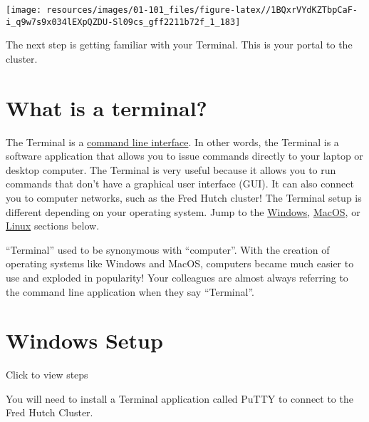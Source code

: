 \documentclass[
]{book}
\begin{document}
\begin{center}\texttt{[image: resources/images/01-101\_files/figure-latex//1BQxrVYdKZTbpCaF-i\_q9w7s9x034lEXpQZDU-Sl09cs\_gff2211b72f\_1\_183]} \end{center}

The next step is getting familiar with your Terminal. This is your portal to the cluster.

\hypertarget{what-is-a-terminal}{%
\section{What is a terminal?}\label{what-is-a-terminal}}

The Terminal is a \href{https://www.codecademy.com/article/command-line-interface}{command line interface}. In other words, the Terminal is a software application that allows you to issue commands directly to your laptop or desktop computer. The Terminal is very useful because it allows you to run commands that don't have a graphical user interface (GUI). It can also connect you to computer networks, such as the Fred Hutch cluster! The Terminal setup is different depending on your operating system. Jump to the \protect\hyperlink{windows}{Windows}, \protect\hyperlink{mac}{MacOS}, or \protect\hyperlink{linux}{Linux} sections below.

``Terminal'' used to be synonymous with ``computer''. With the creation of operating systems like Windows and MacOS, computers became much easier to use and exploded in popularity! Your colleagues are almost always referring to the command line application when they say ``Terminal''.

\hypertarget{windows}{%
\section{Windows Setup}\label{windows}}

Click to view steps

You will need to install a Terminal application called PuTTY to connect to the Fred Hutch Cluster.
\end{document}
